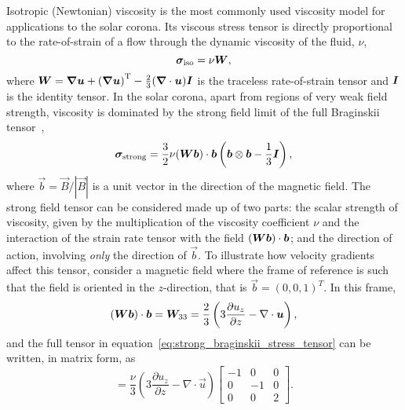 Isotropic (Newtonian) viscosity is the most commonly used viscosity model for applications to the solar corona. Its viscous stress tensor is directly proportional to the rate-of-strain of a flow through the dynamic viscosity of the fluid, $\nu$,
\begin{equation}
{\bm \sigma}_{\text{iso}} = \nu {\bm W},
\label{eq:isotropic_stress_tensor}
\end{equation}
where ${\bm W} = {\bm \nabla {\bm u}} + {({\bm \nabla {\bm u}})}^{\text{T}} - \frac{2}{3}({\bm \nabla} \cdot {\bm u}) {\bm I}$ is the traceless rate-of-strain tensor and ${\bm I}$ is the identity tensor.
In the solar corona, apart from regions of very weak field strength, viscosity is dominated by the strong field limit of the full Braginskii tensor~\cite{hollwegViscosityChewGoldbergerLowEquations1986a},
\begin{equation}
{\bm \sigma}_{\text{strong}} = \frac{3}{2} \nu ({\bm W}{\bm b}) \cdot {\bm b} \left( {\bm b} \otimes {\bm b} - \frac{1}{3}{\bm I}\right),
\label{eq:strong_braginskii_stress_tensor}
\end{equation}
where $\vec{b} = \vec{B}/|\vec{B}|$ is a unit vector in the direction of the magnetic field. The strong field tensor can be considered made up of two parts: the scalar strength of viscosity, given by the multiplication of the viscosity coefficient $\nu$ and the interaction of the strain rate tensor with the field $({\bm W} {\bm b}) \cdot {\bm b}$; and the direction of action, involving \emph{only} the direction of $\vec{b}$.
To illustrate how velocity gradients affect this tensor, consider a magnetic field  where the frame of reference is such that the field is oriented in the $z$-direction, that is $\vec{b} = {(0,0,1)}^T$. In this frame,
   \begin{equation}
   ({\bm W} {\bm b}) \cdot {\bm b} = {\bm W}_{33} = \frac{2}{3}\left(3\frac{\partial u_z}{\partial z} - \nabla \cdot {\bm u} \right),
   \end{equation}
   and the full tensor in equation~\eqref{eq:strong_braginskii_stress_tensor} can be written, in matrix form, as
   \begin{equation}
[\ten{\sigma}_{\text{strong}}] = \frac{\nu}{3}\left(3\frac{\partial u_z}{\partial z} - \nabla \cdot \vec{u} \right)
  \begin{bmatrix}
  -1 & 0 & 0 \\
    0 & -1 & 0 \\
    0 & 0 & 2
    \end{bmatrix}.
    \label{eq:parallel_tensor}
    \end{equation}
